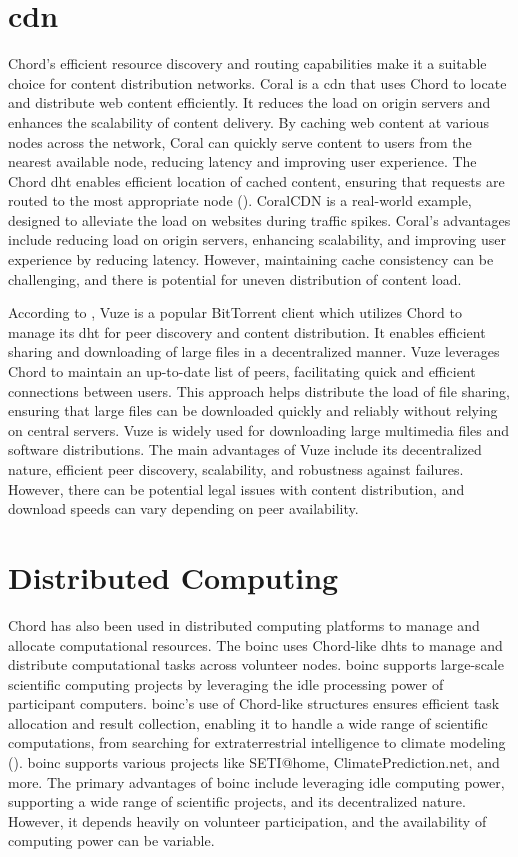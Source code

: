 \section{\acrlong{cdn}}
Chord's efficient resource discovery and routing capabilities make it a suitable choice for content distribution networks.
Coral is a \gls{cdn} that uses Chord to locate and distribute web content efficiently.
It reduces the load on origin servers and enhances the scalability of content delivery.
By caching web content at various nodes across the network, Coral can quickly serve content to users from the nearest available node, reducing latency and improving user experience.
The Chord \gls{dht} enables efficient location of cached content, ensuring that requests are routed to the most appropriate node (\cite{CoralCDN2010}).
CoralCDN is a real-world example, designed to alleviate the load on websites during traffic spikes.
Coral's advantages include reducing load on origin servers, enhancing scalability, and improving user experience by reducing latency.
However, maintaining cache consistency can be challenging, and there is potential for uneven distribution of content load.

According to \cite{iliofotou2010comparing}, Vuze is a popular BitTorrent client which utilizes Chord to manage its \gls{dht} for peer discovery and content distribution.
It enables efficient sharing and downloading of large files in a decentralized manner.
Vuze leverages Chord to maintain an up-to-date list of peers, facilitating quick and efficient connections between users.
This approach helps distribute the load of file sharing, ensuring that large files can be downloaded quickly and reliably without relying on central servers.
Vuze is widely used for downloading large multimedia files and software distributions.
The main advantages of Vuze include its decentralized nature, efficient peer discovery, scalability, and robustness against failures.
However, there can be potential legal issues with content distribution, and download speeds can vary depending on peer availability.

\section{Distributed Computing}
Chord has also been used in distributed computing platforms to manage and allocate computational resources.
The \gls{boinc} uses Chord-like \glspl{dht} to manage and distribute computational tasks across volunteer nodes.
\gls{boinc} supports large-scale scientific computing projects by leveraging the idle processing power of participant computers.
\gls{boinc}'s use of Chord-like structures ensures efficient task allocation and result collection, enabling it to handle a wide range of scientific computations, from searching for extraterrestrial intelligence to climate modeling (\cite{BOINC2004}).
\gls{boinc} supports various projects like SETI@home, ClimatePrediction.net, and more.
The primary advantages of \gls{boinc} include leveraging idle computing power, supporting a wide range of scientific projects, and its decentralized nature.
However, it depends heavily on volunteer participation, and the availability of computing power can be variable.

